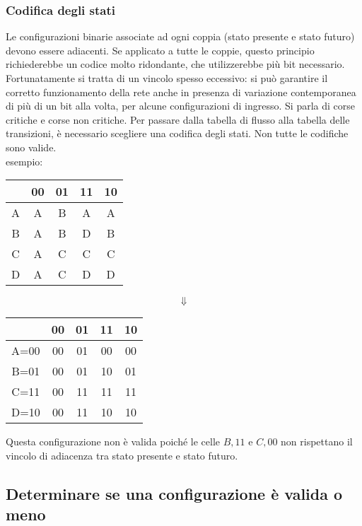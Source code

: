 \documentclass{subfiles}
\begin{document}
\subsubsection{Codifica degli stati}

Le configurazioni binarie associate ad ogni coppia (stato presente e stato futuro) devono essere adiacenti.
Se applicato a tutte le coppie, questo principio richiederebbe un codice molto ridondante, che utilizzerebbe più bit necessario.
Fortunatamente si tratta di un vincolo spesso eccessivo: si può garantire il corretto funzionamento della rete anche in presenza di variazione contemporanea di più di un bit alla volta, per alcune configurazioni di ingresso.
Si parla di corse critiche e corse non critiche.
Per passare dalla tabella di flusso alla tabella delle transizioni, è necessario scegliere una codifica degli stati.
Non tutte le codifiche sono valide.\\

\noindent
esempio:

\begin{center}
\begin{tabular}{ |c|c|c|c|c| }
\hline
& 00 & 01 & 11 & 10 \\
\hline
\hline
A & A & B & A & A \\
B & A & B & D & B \\
C & A & C & C & C \\
D & A & C & D & D \\
\hline
\end{tabular}

$$\Downarrow$$

\begin{tabular}{ |c|c|c|c|c| }
\hline
& 00 & 01 & 11 & 10 \\
\hline
\hline
A=00 & 00 & 01 & 00 & 00 \\
B=01 & 00 & 01 & 10 & 01 \\
C=11 & 00 & 11 & 11 & 11 \\
D=10 & 00 & 11 & 10 & 10 \\
\hline
\end{tabular}
\end{center}

\noindent
Questa configurazione non è valida poiché le celle $B,11$ e $C,00$ non rispettano il vincolo di adiacenza tra stato presente e stato futuro.

\subsection{Determinare se una configurazione è valida o meno}
\end{document}
